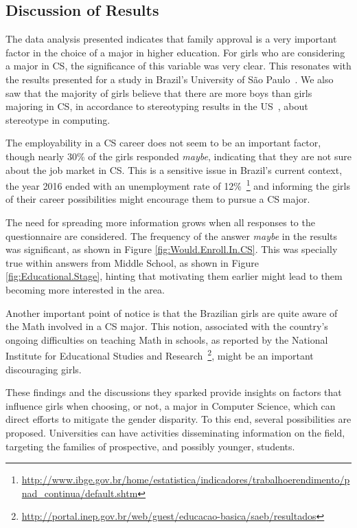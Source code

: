 \subsection{Discussion of Results}\label{sec:perception:discussion}%
The data analysis presented indicates that family approval is a very important factor in the choice of a major in higher education. For girls who are considering a major in CS, the significance of this variable was very clear. This resonates with the results presented for a study in Brazil's University of São Paulo~\cite{saboya_2009}. We also saw that the majority of girls believe that there are more boys than girls majoring in CS, in accordance to stereotyping results in the US~\cite{Mercier_2006}, about stereotype in computing.

The employability in a CS career does not seem to be an important factor, though nearly 30\% of the girls responded \emph{maybe}, indicating that they are not sure about the job market in CS. This is a sensitive issue in Brazil's current context, the year 2016 ended with an unemployment rate of 12\%~\footnote{\url{http://www.ibge.gov.br/home/estatistica/indicadores/trabalhoerendimento/pnad_continua/default.shtm}} and informing the girls of their career possibilities might encourage them to pursue a CS major.

The need for spreading more information grows when all responses to the questionnaire are considered. The frequency of the answer \emph{maybe} in the results was significant, as shown in Figure \ref{fig:Would.Enroll.In.CS}. This was specially true within answers from Middle School, as shown in Figure \ref{fig:Educational.Stage}, hinting that motivating them earlier might lead to them becoming more interested in the area.

Another important point of notice is that the Brazilian girls are quite aware of the Math involved in a CS major. This notion, associated with the country's ongoing difficulties on teaching Math in schools, as reported by the National Institute for Educational Studies and Research~\footnote{\url{http://portal.inep.gov.br/web/guest/educacao-basica/saeb/resultados}}, might be an important discouraging girls.

These findings and the discussions they sparked provide insights on factors that influence girls when choosing, or not, a major in Computer Science, which can direct efforts to mitigate the gender disparity. To this end, several possibilities are proposed. Universities can have activities disseminating information on the field, targeting the families of prospective, and possibly younger, students.

